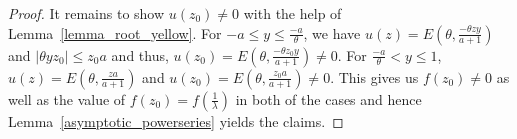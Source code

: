 \documentclass[12pt]{article}
\newcommand{\1}{\mathds{1}}
\theoremstyle{definition}
\theoremstyle{plain}
\theoremstyle{remark}
\begin{document}
\begin{proof}
It remains to show $u(z_0)\neq 0$ with the help of Lemma~\ref{lemma_root_yellow}. For  $-a\leq y \leq \frac{-a}{\theta}$, we have $u(z)= E\left(\theta,\frac{-\theta zy}{a+1}\right)$ and $|\theta yz_0|\le z_0 a$ and thus,
$u(z_0)= E\left(\theta,\frac{-\theta z_0y}{a+1}\right)\neq 0$. %
  For $\frac{-a}{\theta}<y\leq1$, 
  $u(z)= E\left(\theta,\frac{za}{a+1}\right)$ and
      $u(z_0)= E\left(\theta,\frac{z_0a}{a+1}\right)%
      \neq 0$.
   This gives us $f(z_0)\neq 0$ as well as the value of $f(z_0)=f(\frac{1}{\lambda})$ in both of the cases and hence Lemma~\ref{asymptotic_powerseries} yields the claims. 

\end{proof}
\end{document}
